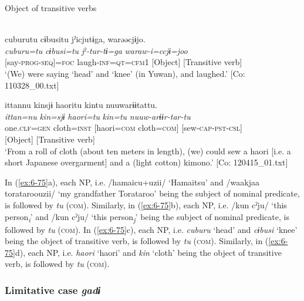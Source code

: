   Object of transitive verbs

\ex{}\\
{\TM}
\gllll  cuburutu  cɨbusitu  jˀicjutɨga,  warəəcjɨjo.\\
\textit{cuburu=tu}  \textit{cɨbusi=tu}  \textit{jˀ-tur-tɨ=ga}  \textit{waraw-i=ccjɨ=joo}\\
[head=\textsc{com}  knee=\textsc{com}]  [say-\textsc{prog}-\textsc{seq}]=\textsc{foc}  laugh-\textsc{inf}=\textsc{qt}=\textsc{cfm}1
      {}[Object]  [Transitive verb]  \\
\glt ‘(We) were saying ‘head’ and ‘knee’ (in Yuwan), and laughed.’ [Co: 110328\_00.txt]
\z

\ex {\TM}  ittannu  kinsjɨ  {\textbar}haori{\textbar}tu  kintu  nuuwarɨɨtattu.\\
\gllll \textit{ittan=nu}  \textit{kin=sjɨ}  \textit{haori=tu}  \textit{kin=tu}  \textit{nuuw-arɨɨr-tar-tu}\\
one.\textsc{clf}=\textsc{gen}  cloth=\textsc{inst}  [haori=\textsc{com}  cloth=\textsc{com}]  [sew-\textsc{cap}-\textsc{pst}-\textsc{csl}]\\
          {}[Object]  [Transitive verb]\\
\glt ‘From a roll of cloth (about ten meters in length), (we) could sew a haori [i.e. a short Japanese overgarment] and a (light cotton) kimono.’ [Co: 120415\_01.txt]
\z

In (\ref{ex:6-75}a), each NP, i.e. /hamaicu+uzii/ ‘Hamaitsu’ and /waakjaa torataroouzii/ ‘my grandfather Torataroo’ being the subject of nominal predicate, is followed by \textit{tu} (\textsc{com}). Similarly, in (\ref{ex:6-75}b), each NP, i.e. /kun cˀju/ ‘this person\textit{\textsubscript{i}}’ and /kun cˀju/ ‘this person\textit{\textsubscript{j}}’ being the subject of nominal predicate, is followed by \textit{tu} (\textsc{com}). In (\ref{ex:6-75}c), each NP, i.e. \textit{cuburu} ‘head’ and \textit{cɨbusi} ‘knee’ being the object of transitive verb, is followed by \textit{tu} (\textsc{com}). Similarly, in (\ref{ex:6-75}d), each NP, i.e. \textit{haori} ‘haori’ and \textit{kin} ‘cloth’ being the object of transitive verb, is followed by \textit{tu} (\textsc{com}).

\subsubsection{ Limitative case \textit{gadɨ}}

